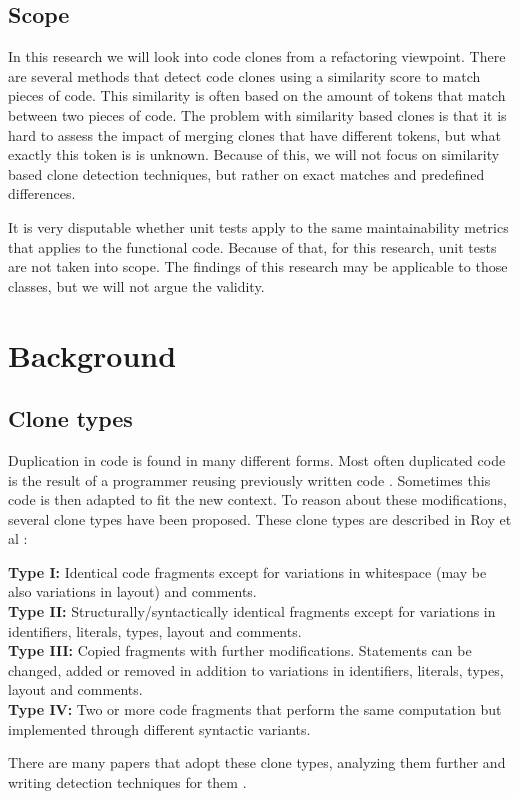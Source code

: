 \documentclass{report}
\theoremstyle{definition}
\theoremstyle{remark}
\begin{document}
\section{Scope}
In this research we will look into code clones from a refactoring viewpoint. There are several methods that detect code clones using a similarity score to match pieces of code. This similarity is often based on the amount of tokens that match between two pieces of code. The problem with similarity based clones is that it is hard to assess the impact of merging clones that have different tokens, but what exactly this token is is unknown. Because of this, we will not focus on similarity based clone detection techniques, but rather on exact matches and predefined differences.

It is very disputable whether unit tests apply to the same maintainability metrics that applies to the functional code. Because of that, for this research, unit tests are not taken into scope. The findings of this research may be applicable to those classes, but we will not argue the validity. %

\chapter{Background}
\section{Clone types}
Duplication in code is found in many different forms. Most often duplicated code is the result of a programmer reusing previously written code \cite{haefliger2008code, baxter1998clone}. Sometimes this code is then adapted to fit the new context. To reason about these modifications, several clone types have been proposed. These clone types are described in Roy et al \cite{roy2007survey}:
\begin{displayquote}
\textbf{Type I:} Identical code fragments except for variations in whitespace (may be also variations in layout) and comments.\\
\textbf{Type II:} Structurally/syntactically identical fragments except for variations in identifiers, literals, types, layout and comments.\\
\textbf{Type III:} Copied fragments with further modifications. Statements can be changed, added or removed in addition to variations in identifiers, literals, types, layout and comments.\\
\textbf{Type IV:} Two or more code fragments that perform the same computation but implemented through different syntactic variants.
\end{displayquote}
There are many papers that adopt these clone types, analyzing them further and writing detection techniques for them \cite{sajnani2016sourcerercc, kodhai2010detection}.
\end{document}
